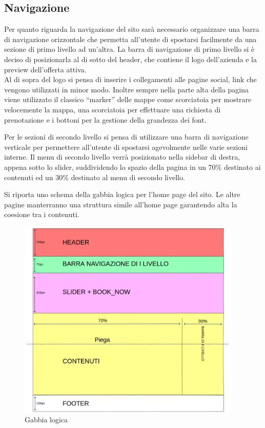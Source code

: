 \documentclass[a4paper,12pt,hidelinks]{report}
\begin{document}
  \subsection{Navigazione}
    Per quanto riguarda la navigazione del sito sarà necessario organizzare una barra di navigazione orizzontale che permetta all'utente di spostarsi 
    facilmente da una sezione di primo livello ad un'altra. La barra di navigazione di primo livello si è deciso di posizionarla al di sotto del header, 
    che contiene il logo dell'azienda e la preview dell'offerta attiva. 
    \\ Al di sopra del logo si pensa di inserire i collegamenti alle pagine social, link che vengono utilizzati in minor modo.
    Inoltre sempre nella parte alta della pagina viene utilizzato il classico ``marker'' delle mappe come scorciatoia per mostrare velocemente la mappa, 
    una scorciatoia per effettuare una richiesta di prenotazione e i bottoni per la gestione della grandezza dei font.
    \par Per le sezioni di secondo livello si pensa di utilizzare una barra di navigazione verticale per permettere all'utente di spostarsi agevolmente
    nelle varie sezioni interne. Il menu di secondo livello verrà posizionato nella sidebar di destra, appena sotto lo slider, 
    suddividendo lo spazio della pagina in un 70\% destinato ai contenuti ed un 30\% destinato al menu di secondo livello.
    \par Si riporta uno schema della gabbia logica per l'home page del sito. Le altre pagine manterranno una struttura simile all'home page garantendo alta la coesione
    tra i contenuti.
    \begin{figure}[h!]%
      \includegraphics[width=0.95\textwidth,keepaspectratio=true]{../img/gabbiaLogica}
      \centering
      \caption{Gabbia logica}%
      \label{fig:gabbiaLogica}%
    \end{figure}
  \newpage
  
\end{document}

